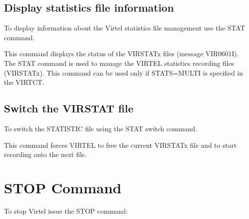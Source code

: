 \documentclass[letterpaper,10pt,english]{sphinxmanual}
\begin{document}
\subsection{Display statistics file information}
\label{\detokenize{audit_operations_ and_performance:display-statistics-file-information}}
\sphinxAtStartPar
To display information about the Virtel statistics file management use the STAT command.

\begin{sphinxVerbatim}[commandchars=\\\{\}]
\end{sphinxVerbatim}

\sphinxAtStartPar
This command displays the status of the VIRSTATx files (message VIR0601I). The STAT command is used to manage the VIRTEL statistics recording files (VIRSTATx). This command can be used only if STATS=MULTI is specified in the VIRTCT.


\subsection{Switch the VIRSTAT file}
\label{\detokenize{audit_operations_ and_performance:switch-the-virstat-file}}
\sphinxAtStartPar
To switch the STATISTIC file using the STAT switch command.

\begin{sphinxVerbatim}[commandchars=\\\{\}]
\end{sphinxVerbatim}

\sphinxAtStartPar
This command forces VIRTEL to free the current VIRSTATx file and to start recording onto the next file.

\ignorespaces 

\section{STOP Command}
\label{\detokenize{audit_operations_ and_performance:stop-command}}\label{\detokenize{audit_operations_ and_performance:index-24}}
\sphinxAtStartPar
To stop Virtel issue the STOP command:

\begin{sphinxVerbatim}[commandchars=\\\{\}]
\end{sphinxVerbatim}
\end{document}
